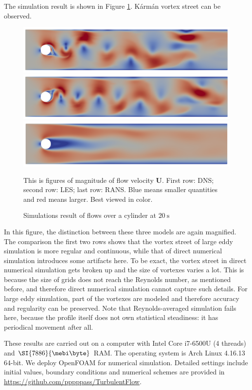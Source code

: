 \documentclass[english, nochinese]{pkupaper}
\begin{document}
The simulation result is shown in Figure \ref{Fig:Cyl}. K\'arm\'an vortex street can be observed.

\begin{figure}
{
\centering
{
\includegraphics[width=15cm]{Results/Figure03a.pdf}
\includegraphics[width=15cm]{Results/Figure03b.pdf}
\includegraphics[width=15cm]{Results/Figure03c.pdf}
}
\caption{Simulations result of flows over a cylinder at $\SI{20}{\second}$}
\label{Fig:Cyl}
}
{
\footnotesize
This is figures of magnitude of flow velocity $\mathbf{U}$. First row: DNS; second row: LES; last row: RANS. Blue means smaller quantities and red means larger. Best viewed in color.
}
\end{figure}

In this figure, the distinction between these three models are again magnified. The comparison the first two rows shows that the vortex street of large eddy simulation is more regular and continuous, while that of direct numerical simulation introduces some artifacts here. To be exact, the vortex street in direct numerical simulation gets broken up and the size of vortexes varies a lot. This is because the size of grids does not reach the Reynolds number, as mentioned before, and therefore direct numerical simulation cannot capture such details. For large eddy simulation, part of the vortexes are modeled and therefore accuracy and regularity can be preserved. Note that Reynolds-averaged simulation fails here, because the profile itself does not own statistical steadiness: it has periodical movement after all.

These results are carried out on a computer with Intel Core i7-6500U (4 threads) and $\SI{7886}{\mebi\byte}$ RAM. The operating system is Arch Linux 4.16.13 64-bit. We deploy OpenFOAM \parencite{weller_tensorial_1998} for numerical simulation. Detailed settings include initial values, boundary conditions and numerical schemes are provided in \url{https://github.com/pppppass/TurbulentFlow}.
\end{document}
